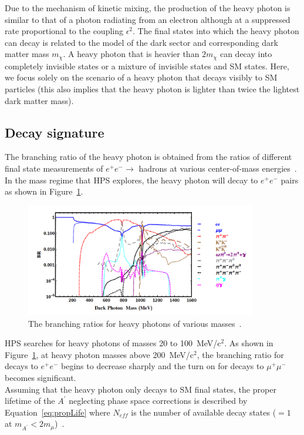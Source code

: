 Due to the mechanism of kinetic mixing, the production of the heavy photon is similar to that of a photon radiating from an electron although at a suppressed rate proportional to the coupling $\epsilon^2$. The final states into which the heavy photon can decay is related to the model of the dark sector and corresponding dark matter mass $m_{\chi}$. A heavy photon that is heavier than $2m_{\chi}$ can decay into completely invisible states or a mixture of invisible states and SM states. Here, we focus solely on the scenario of a heavy photon that decays visibly to SM particles (this also implies that the heavy photon is lighter than twice the lightest dark matter mass). 

\subsection{Decay signature}
The branching ratio of the heavy photon is obtained from the ratios of different final state measurements of $e^+e^-\rightarrow $ hadrons at various center-of-mass energies~\cite{liu_signals_2015}. In the mass regime that HPS explores, the heavy photon will decay to $e^+e^-$ pairs as shown in Figure~\ref{Figure:br}. 

\begin{figure}[htb]
  \centering
      \includegraphics[width=0.9\textwidth]{pics/motivation/branchingRatio.png}
  \caption[The branching ratios for heavy photon decays]{The branching ratios for heavy photons of various masses~\cite{liu_signals_2015}.}
  \label{Figure:br}
\end{figure}

HPS searches for heavy photons of masses 20 to 100~MeV/c$^2$. As shown in Figure~\ref{Figure:br}, at heavy photon masses above 200~MeV/c$^2$, the branching ratio for decays to $e^+e^-$ begins to decrease sharply and the turn on for decays to $\mu^+\mu^-$ becomes significant. \\
\indent Assuming that the heavy photon only decays to SM final states, the proper lifetime of the $A^{\prime}$ neglecting phase space corrections is described by Equation~\eqref{eq:propLife} where $N_{eff}$ is the number of available decay states ($=1$ at $m_{A^{\prime}}<2m_{\mu}$)~\cite{bjorken_new_2009}. 

